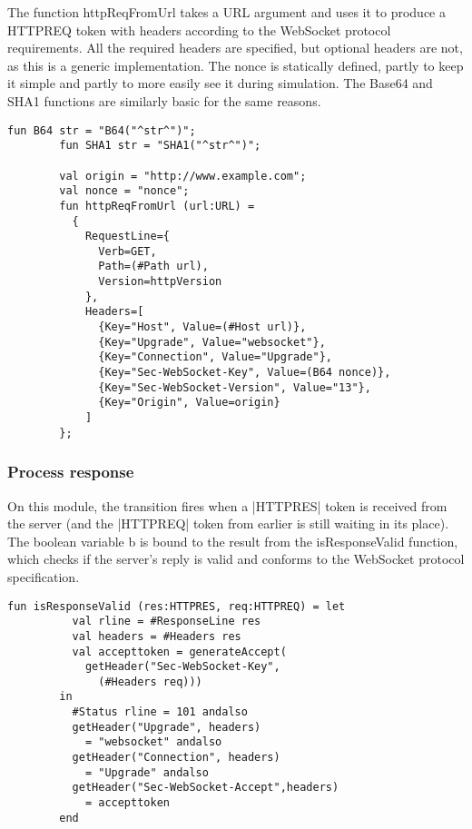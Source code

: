 		The function httpReqFromUrl takes a URL argument and uses it to produce a
		HTTPREQ token with headers according to the WebSocket protocol requirements.
		All the required headers are specified, but optional headers are not, as this
		is a generic implementation. The nonce is statically defined, partly to keep
		it simple and partly to more easily see it during simulation. The Base64 and
		SHA1 functions are similarly basic for the same reasons.
		
		\begin{lstlisting}[label=lst:httpReqFromUrl,caption=httpReqFromUrl,gobble=2]
		fun B64 str = "B64("^str^")";
		fun SHA1 str = "SHA1("^str^")";

		val origin = "http://www.example.com";
		val nonce = "nonce";
		fun httpReqFromUrl (url:URL) = 
          {
            RequestLine={
              Verb=GET, 
              Path=(#Path url),
              Version=httpVersion
            },
            Headers=[
              {Key="Host", Value=(#Host url)},
              {Key="Upgrade", Value="websocket"},
              {Key="Connection", Value="Upgrade"},
              {Key="Sec-WebSocket-Key", Value=(B64 nonce)},
              {Key="Sec-WebSocket-Version", Value="13"},
              {Key="Origin", Value=origin}
            ]
		};
		\end{lstlisting}
		
		
		
	\subsubsection{Process response}
		
		
		On this module, the transition fires when a |HTTPRES| token is received from
		the server (and the |HTTPREQ| token from earlier is still waiting in its
		place). The boolean variable b is bound to the result from the isResponseValid function,
		which checks if the server's reply is valid and conforms to the WebSocket
		protocol specification.
		
		\begin{lstlisting}[label=lst:isResponseValid,caption=isResponseValid,gobble=2]
		fun isResponseValid (res:HTTPRES, req:HTTPREQ) = let
		  val rline = #ResponseLine res
		  val headers = #Headers res
		  val accepttoken = generateAccept(
		    getHeader("Sec-WebSocket-Key",
		      (#Headers req)))
		in
		  #Status rline = 101 andalso
		  getHeader("Upgrade", headers) 
		    = "websocket" andalso
		  getHeader("Connection", headers) 
		    = "Upgrade" andalso
		  getHeader("Sec-WebSocket-Accept",headers)
		    = accepttoken
		end
		\end{lstlisting}
		
